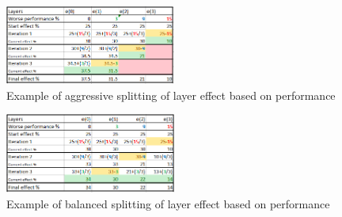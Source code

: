 \begin{figure}
    \includegraphics[width=0.5\textwidth]{figures/fredsplit/aggresiveAlgo.png}
    \centering
    \caption{Example of aggressive splitting of layer effect based on performance}
    \label{fig:fredsplitAgg}
\end{figure}
\begin{figure}
    \includegraphics[width=0.5\textwidth]{figures/fredsplit/balancedAlgo.png}
    \centering
    \caption{Example of balanced splitting of layer effect based on performance}
    \label{fig:fredsplitBal}
\end{figure}

